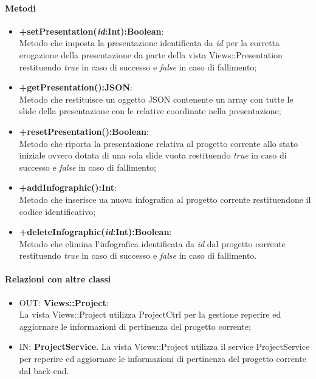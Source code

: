 	\paragraph{Metodi}
	\begin{itemize}
	  	\item \textbf{+setPresentation(\textit{id}:Int):Boolean}:\\
		  	Metodo che imposta la presentazione identificata da  \textit{id} per la corretta erogazione della presentazione da parte della vista Views::Presentation restituendo \textit{true} in caso di successo e \textit{false} in caso di fallimento;
	  	\item \textbf{+getPresentation():JSON}:\\
		  	Metodo che restituisce un oggetto JSON contenente un array con tutte le slide della presentazione con le relative coordinate nella presentazione;
	 	\item \textbf{+resetPresentation():Boolean}:\\
			Metodo che riporta la presentazione relativa al progetto corrente allo stato iniziale ovvero dotata di una sola slide vuota restituendo \textit{true} in caso di successo e \textit{false} in caso di fallimento;
		\item \textbf{+addInfographic():Int}:\\
			Metodo che inserisce ua nuova infografica al progetto corrente restituendone il codice identificativo;
		\item \textbf{+deleteInfographic(\textit{id}:Int):Boolean}:\\
	  		Metodo che elimina l'infografica identificata da \textit{id} dal progetto corrente restituendo \textit{true} in caso di successo e \textit{false} in caso di fallimento.
		
		  
	\end{itemize}
	\paragraph{Relazioni con altre classi}
	\begin{itemize}
	  \item OUT: \textbf{Views::Project}:\\
		La vista Views::Project utilizza ProjectCtrl per la gestione reperire ed aggiornare le informazioni di pertinenza del progetto corrente;	
	  \item IN: \textbf{ProjectService}.
		La vista Views::Project utilizza il service ProjectService per reperire ed aggiornare le informazioni di pertinenza del progetto corrente dal back-end.
	\end{itemize}

